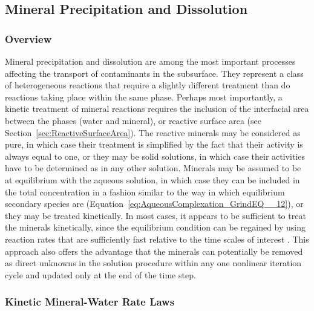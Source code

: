 
\subsection{Mineral Precipitation and Dissolution} 
\label{sec:mineralPrecipDissolution}

\subsubsection{Overview} 

Mineral precipitation and dissolution are among the most important
processes affecting the transport of contaminants in the subsurface.
They represent a class of heterogeneous reactions that require a
slightly different treatment than do reactions taking place within the
same phase.  Perhaps most importantly, a kinetic treatment of mineral
reactions requires the inclusion of the interfacial area between the
phases (water and mineral), or reactive surface area (see
Section~\ref{sec:ReactiveSurfaceArea}).  The reactive minerals may be
considered as pure, in which case their treatment is simplified by the
fact that their activity is always equal to one, or they may be solid
solutions, in which case their activities have to be determined as in
any other solution.  Minerals may be assumed to be at equilibrium with
the aqueous solution, in which case they can be included in the total
concentration in a fashion similar to the way in which equilibrium
secondary species are (Equation~\eqref{eq:AqueousComplexation_GrindEQ__12}), 
or they may be treated kinetically.  In most cases, it appears to be sufficient to
treat the minerals kinetically, since the equilibrium condition can be
regained by using reaction rates that are sufficiently fast relative
to the time scales of interest \citep{steefel_1996}.  This approach
also offers the advantage that the minerals can potentially be removed
as direct unknowns in the solution procedure within any one nonlinear
iteration cycle and updated only at the end of the time step.

\subsubsection{Kinetic Mineral-Water Rate Laws}

